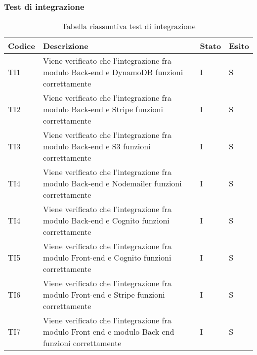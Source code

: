 \subsubsection{Test di integrazione}
{

\centering
\renewcommand{\arraystretch}{2}
\begin{longtable}{C{2cm} C{9.6cm} C{1.5cm} C{1cm}}
\caption{Tabella riassuntiva test di integrazione}\\
\textbf{Codice} &
\textbf{Descrizione}&
\textbf{Stato}&
\textbf{Esito}\\
\endhead


TI1 & Viene verificato che l'integrazione fra modulo Back-end e DynamoDB funzioni correttamente & I & S\\

TI2 & Viene verificato che l'integrazione fra modulo Back-end e Stripe funzioni correttamente & I & S\\

TI3 & Viene verificato che l'integrazione fra modulo Back-end e S3 funzioni correttamente & I & S\\

TI4 & Viene verificato che l'integrazione fra modulo Back-end e Nodemailer funzioni correttamente & I & S\\

TI4 & Viene verificato che l'integrazione fra modulo Back-end e Cognito funzioni correttamente & I & S\\

TI5 & Viene verificato che l'integrazione fra modulo Front-end e Cognito funzioni correttamente & I & S\\

TI6 & Viene verificato che l'integrazione fra modulo Front-end e Stripe funzioni correttamente & I & S\\

TI7 & Viene verificato che l'integrazione fra modulo Front-end e modulo Back-end funzioni correttamente & I & S\\



\end{longtable}

}

